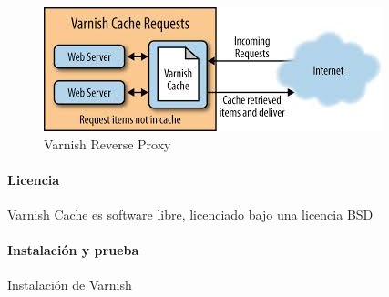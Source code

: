\begin{figure}[H]
  \includegraphics[width=\linewidth]{src/images/03-capitulo-3/tecnologias/varnish/reverse-proxy.jpg}
  \caption{Varnish Reverse Proxy}
  \label{fig:varnish}
\end{figure}

\paragraph{Licencia}

Varnish Cache es software libre, licenciado bajo una licencia BSD

\paragraph{Instalación y prueba}

\begin{listing}[H]
  \caption{Instalación de Varnish}
  \label{soa:tecnologias:varnish-cache:bash-preparacion}
\end{listing}
